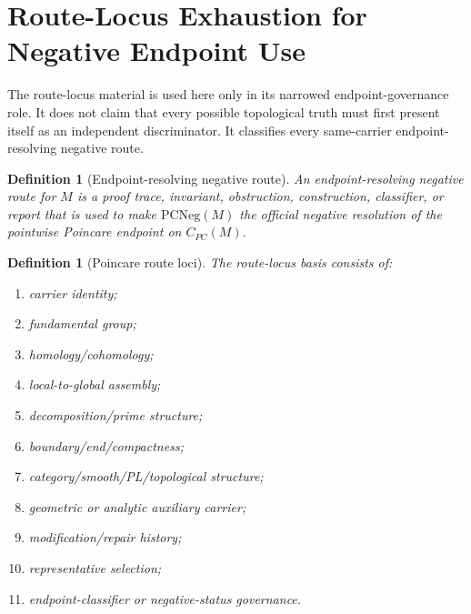 \documentclass[11pt]{article}
\newtheorem{definition}[theorem]{Definition}
\newcommand{\CarrierPC}{C_{PC}}
\newcommand{\PCNeg}{\mathrm{PCNeg}}
\begin{document}
\section{Route-Locus Exhaustion for Negative Endpoint Use}\label{sec:route-locus}

The route-locus material is used here only in its narrowed endpoint-governance role. It does not claim that every possible topological truth must first present itself as an independent discriminator. It classifies every same-carrier endpoint-resolving negative route.

\begin{definition}[Endpoint-resolving negative route]
An endpoint-resolving negative route for \(M\) is a proof trace, invariant, obstruction, construction, classifier, or report that is used to make \(\PCNeg(M)\) the official negative resolution of the pointwise Poincare endpoint on \(\CarrierPC(M)\).
\end{definition}

\begin{definition}[Poincare route loci]
The route-locus basis consists of:
\begin{enumerate}[label=L\arabic*.]
\item carrier identity;
\item fundamental group;
\item homology/cohomology;
\item local-to-global assembly;
\item decomposition/prime structure;
\item boundary/end/compactness;
\item category/smooth/PL/topological structure;
\item geometric or analytic auxiliary carrier;
\item modification/repair history;
\item representative selection;
\item endpoint-classifier or negative-status governance.
\end{enumerate}
\end{definition}
\end{document}
